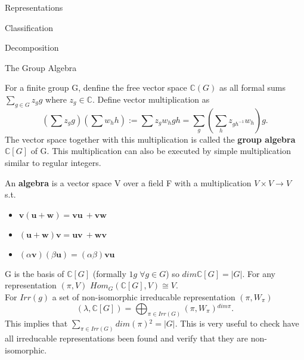 \documentclass[12pt, letterpaper]{article}
\newcommand{\C}{\mathbb{C}}
\begin{document}
\begin{section}{Representations}
\begin{subsection}{Classification}
\begin{subsubsection}{Decomposition}
    \end{subsubsection}

  \end{subsection}

  \begin{subsection}{The Group Algebra}

    For a finite group G, denfine the free vector space \(\C(G)\) as all formal
    sums \(\sum_{g \in G} z_{g} g\) where \(z_{g} \in \C\). Define vector
    multiplication as \[(\sum z_{g} g)(\sum w_{h} h) := \sum z_{g}w_{h} gh =
      \sum_{g}(\sum_{h} z_{gh^{-1}} w_{h}) g.\] The vector space together with
    this multiplication is called the \textbf{group algebra} \(\C[G]\) of G.
    This multiplication can also be executed by simple multiplication similar to
    regular integers.

    An \textbf{algebra} is a vector space V over a field F with a multiplication
    \(V \times V \to V\) s.t.\
    \begin{itemize}
      \item \(\textbf{v} (\textbf{u} + \textbf{w}) =
            \textbf{vu}\ + \textbf{vw}\)
      \item \((\textbf{u} + \textbf{w}) \textbf{v}=
            \textbf{uv}\ + \textbf{wv}\)
      \item \((\alpha \textbf{v})(\beta \textbf{u}) =
            (\alpha \beta) \textbf{vu}\)
    \end{itemize}

    G is the basis of \(\C[G]\) (formally \(1g \; \forall g \in G\)) so
    \(dim \C[G] = |G|\). For any representation \((\pi, V)\)
    \(Hom_{G}(\C[G], V) \cong V\). \\
    For \(Irr(g)\) a set of non-isomorphic irreducable representation
    \((\pi, W_{\pi})\)
    \[(\lambda, \C[G]) = \bigoplus_{\pi \in Irr(G)} (\pi, W_{\pi}){}^{dim \pi}.\]
    This implies that \(\sum_{\pi \in Irr(G)} dim(\pi){}^{2} = |G|\). This is
    very useful to check have all irreducable representations been found and
    verify that they are non-isomorphic.

  \end{subsection}

\end{section}
\end{document}
